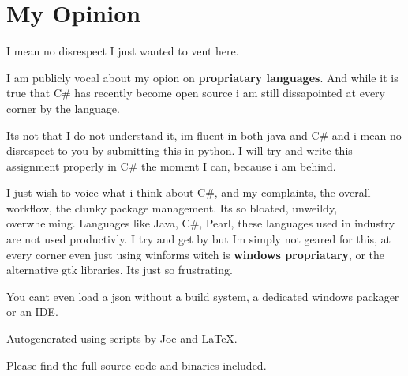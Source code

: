 \documentclass[12pt]{article}
\begin{document}
\newpage

\section{My Opinion}

I mean no disrespect I just wanted to vent here.

\vspace{2cm}

I am publicly vocal about my opion on \textbf{propriatary languages}. And while it is true that C\# has recently become open source i am still dissapointed
at every corner by the language.

Its not that I do not understand it, im fluent in both java and C\# and i mean no disrespect to you by submitting this in python. I will try and write
this assignment properly in C\# the moment I can, because i am behind.

I just wish to voice what i think about C\#, and my complaints, the overall workflow, the clunky package management. Its so bloated, unweildy, overwhelming.
Languages like Java, C\#, Pearl, these languages used in industry are not used productivly. I try and get by but Im simply not geared for this, at every
corner even just using winforms witch is \textbf{windows propriatary}, or the alternative gtk libraries. Its just so frustrating.

You cant even load a json without a build system, a dedicated windows packager or an IDE.

\newpage

Autogenerated using scripts by Joe and \LaTeX.

Please find the full source code and binaries included.
\end{document}
